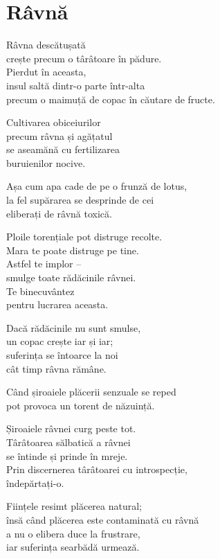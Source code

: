 
\chapter{Râvnă}


Râvna descătușată\\
crește precum o târâtoare în pădure.\\
Pierdut în aceasta,\\
insul saltă dintr-o parte într-alta\\
precum o maimuță de copac în căutare de fructe.


Cultivarea obiceiurilor\\
precum râvna și agățatul\\
se aseamănă cu fertilizarea\\
buruienilor nocive.


Așa cum apa cade de pe o frunză de lotus,\\
la fel supărarea se desprinde de cei\\
eliberați de râvnă toxică.


Ploile torențiale pot distruge recolte.\\
Mara te poate distruge pe tine.\\
Astfel te implor –\\
smulge toate rădăcinile râvnei.\\
Te binecuvântez\\
pentru lucrarea aceasta.


Dacă rădăcinile nu sunt smulse,\\
un copac crește iar și iar;\\
suferința se întoarce la noi\\
cât timp râvna rămâne.


Când șiroaiele plăcerii senzuale se reped\\
pot provoca un torent de năzuință.


Șiroaiele râvnei curg peste tot.\\
Târâtoarea sălbatică a râvnei\\
se întinde și prinde în mreje.\\
Prin discernerea târâtoarei cu introspecție,\\
îndepărtați-o.


Ființele resimt plăcerea natural;\\
însă când plăcerea este contaminată cu râvnă\\
a nu o elibera duce la frustrare,\\
iar suferința searbădă urmează.


